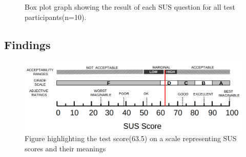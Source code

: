 \begin{figure}[H]
	\caption{Box plot graph showing the result of each SUS question for all test participants(n=10).}
	\label{fig:boxPlotResults}
\end{figure}

\subsection{Findings}

\begin{figure}[H]
	\centering
	\includegraphics[width=1\linewidth]{figure/Design/susScore}
	\caption{Figure highlighting the test score(63.5) on a scale representing SUS scores and their meanings\cite{susScore}}
	\label{fig:susScore}
\end{figure}

